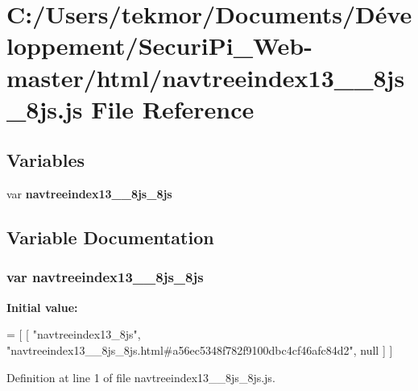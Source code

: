 \section{C\+:/\+Users/tekmor/\+Documents/\+Développement/\+Securi\+Pi\+\_\+\+Web-\/master/html/navtreeindex13\+\_\+\+\_\+8js\+\_\+8js.js File Reference}
\label{navtreeindex13____8js__8js_8js}
\subsection*{Variables}
\begin{DoxyCompactItemize}
\item 
var {\bf navtreeindex13\+\_\+\+\_\+8js\+\_\+8js}
\end{DoxyCompactItemize}


\subsection{Variable Documentation}
\subsubsection[{navtreeindex13\+\_\+\+\_\+8js\+\_\+8js}]{\setlength{\rightskip}{0pt plus 5cm}var navtreeindex13\+\_\+\+\_\+8js\+\_\+8js}\label{navtreeindex13____8js__8js_8js_aa958a3d81ea09e795182ade1f3e06dba}
{\bfseries Initial value\+:}
\begin{DoxyCode}
=
[
    [ \textcolor{stringliteral}{"navtreeindex13\_8js"}, \textcolor{stringliteral}{"navtreeindex13\_\_8js\_8js.html#a56ec5348f782f9100dbc4cf46afc84d2"}, null ]
]
\end{DoxyCode}


Definition at line 1 of file navtreeindex13\+\_\+\+\_\+8js\+\_\+8js.\+js.

